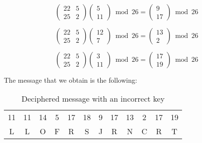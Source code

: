 \documentclass[titlepage, 12pt]{article}
\numberwithin{equation}{section}%
\numberwithin{figure}{section}%
\numberwithin{table}{section}%
\begin{document}
\begin{enumerate}
		\begin{equation*}
			\begin{pmatrix}
			22 & 5 \\
			25 & 2
			\end{pmatrix}
			\begin{pmatrix}
			5 \\
			11
			\end{pmatrix}\bmod{26} = 
			\begin{pmatrix}
			9 \\
			17
			\end{pmatrix}\bmod{26}
		\end{equation*}
		
		\begin{equation*}
			\begin{pmatrix}
			22 & 5 \\
			25 & 2
			\end{pmatrix}
			\begin{pmatrix}
			12 \\
			7
			\end{pmatrix}\bmod{26} = 
			\begin{pmatrix}
			13 \\
			2
			\end{pmatrix}\bmod{26}
		\end{equation*}
		
		\begin{equation*}
			\begin{pmatrix}
			22 & 5 \\
			25 & 2
			\end{pmatrix}
			\begin{pmatrix}
			3 \\
			11
			\end{pmatrix}\bmod{26} = 
			\begin{pmatrix}
			17 \\
			19
			\end{pmatrix}\bmod{26}
		\end{equation*}		
		
		The message that we obtain is the following:
		
		\begin{table}[H]
			\centering
			\caption{Deciphered message with an incorrect key}
			\begin{tabular}{cccccccccccc}
				11&11&14&5&17&18&9&17&13&2&17&19\\
				L&L&O&F&R&S&J&R&N&C&R&T		
			\end{tabular}
		\end{table}
		

\end{enumerate}
\end{document}
